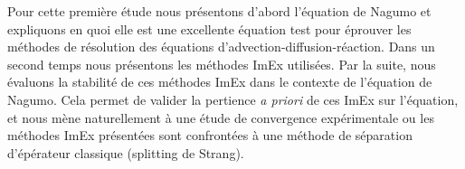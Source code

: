 Pour cette première étude nous présentons d'abord l'équation de Nagumo et expliquons en quoi 
elle est une excellente équation test pour éprouver les méthodes de résolution des équations d'advection-diffusion-réaction. 
Dans un second temps nous présentons les méthodes ImEx utilisées.
Par la suite, nous évaluons la stabilité de ces méthodes ImEx dans le contexte de l'équation de Nagumo.
Cela permet de valider la pertience \textit{a priori} de ces ImEx sur l'équation, et nous mène naturellement à une étude de convergence expérimentale
ou les méthodes ImEx présentées sont confrontées à une méthode de séparation d'épérateur classique (splitting de Strang).